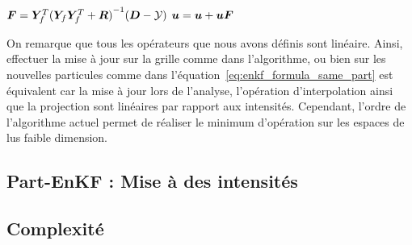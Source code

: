 \begin{itemize}
\begin{algorithm}

    $ \bm{F} = \bm Y_f^T {(\bm Y_f \bm Y_f^T + \bm R)}^{-1}(\bm{D} - \mathcal{Y})$ 
    $\bm u = \bm u + \bm u \bm{F}$ 
\end{algorithm}


On remarque que tous les opérateurs que nous avons définis sont linéaire. Ainsi, effectuer la mise à jour sur la grille comme dans l'algorithme, ou bien sur les nouvelles particules comme dans l'équation~\eqref{eq:enkf_formula_same_part} est équivalent car la mise à jour lors de l'analyse, l'opération d'interpolation ainsi que la projection sont linéaires par rapport aux intensités.
Cependant, l'ordre de l'algorithme actuel permet de réaliser le minimum d'opération sur les espaces de lus faible dimension.


\subsection{Part-EnKF : Mise à des intensités}


\subsection{Complexité}




\end{itemize}
